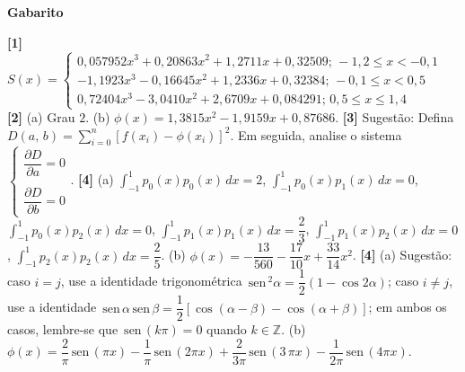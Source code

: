 \documentclass[12pt,a4paper]{article}
\newcommand{\sen}{\,\textrm{sen}\,}
\begin{document}
\begin{center}
\textbf{Gabarito}
\end{center} 
\textbf{[1]} $S(x) = \begin{cases}
                      0,057952x^3 + 0,20863x^2 + 1,2711x + 0,32509;\,-1,2 \leq x < -0,1 \\
                      -1,1923x^3 - 0,16645x^2 + 1,2336x + 0,32384;\,-0,1 \leq x < 0,5 \\
                      0,72404x^3 - 3,0410x^2 + 2,6709x + 0,084291;\,0,5 \leq x \leq 1,4
                     \end{cases}
$ 
\textbf{[2]} (a) Grau $2$. (b) $\phi(x) = 1,3815x^2 - 1,9159x + 0,87686$. 
\textbf{[3]} Sugestão: Defina $\displaystyle D(a,\,b) = \sum_{i=0}^n \left[f(x_i) - \phi(x_i)\right]^2$. Em seguida, analise o sistema $\begin{cases}\dfrac{\partial D}{\partial a} = 0 \\ \\ \dfrac{\partial D}{\partial b} = 0\end{cases}$. 
\textbf{[4]} (a) $\displaystyle\int_{-1}^1 p_0(x)p_0(x)\,dx = 2$, $\displaystyle\int_{-1}^1 p_0(x)p_1(x)\,dx = 0$, \\ 
$\displaystyle\int_{-1}^1 p_0(x)p_2(x)\,dx = 0$,  $\displaystyle\int_{-1}^1 p_1(x)p_1(x)\,dx = \dfrac{2}{3}$, $\displaystyle\int_{-1}^1 p_1(x)p_2(x)\,dx = 0$, $\displaystyle\int_{-1}^1 p_2(x)p_2(x)\,dx = \dfrac{2}{5}$. 
(b) $\phi(x) = -\dfrac{13}{560} - \dfrac{17}{10}x + \dfrac{33}{14}x^2$. 
\textbf{[4]} (a) Sugestão: caso $i = j$, use a identidade 
trigonométrica $\sen^2 \alpha = \dfrac{1}{2}(1 - \cos 2\alpha)$; caso $i\neq j$, 
use a identidade $\sen \alpha\sen \beta = \dfrac{1}{2}[\cos(\alpha-\beta)-\cos(\alpha+\beta)]$; 
em ambos os casos, lembre-se que $\sen(k\pi) = 0$ quando $k\in \mathbb{Z}$. 
(b) $\phi(x) = \dfrac{2}{\pi}\sen\left(\pi x\right) - \dfrac{1}{\pi}\sen\left(2 \pi x\right) + \dfrac{2}{3\pi}\sen\left(3 \, \pi x\right) -\dfrac{1}{2\pi}\sen\left(4\pi x\right)$. 
\end{document}

